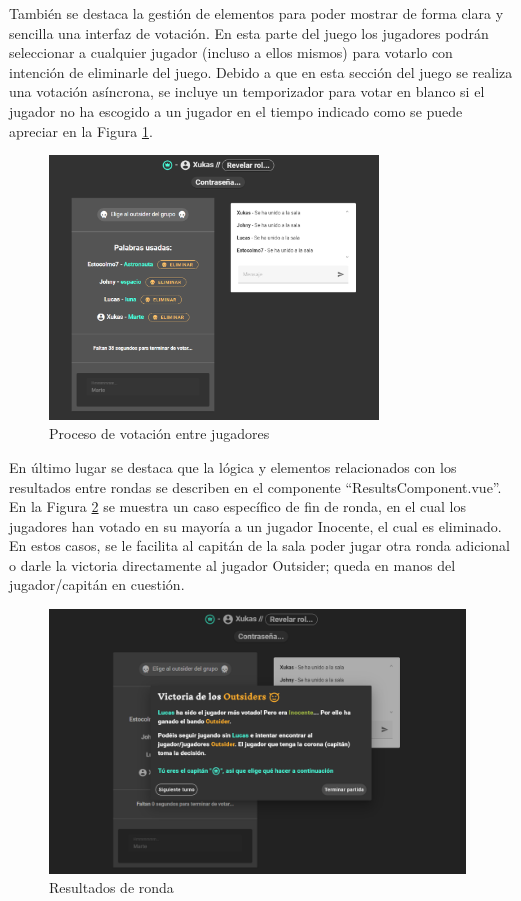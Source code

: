 También se destaca la gestión de elementos para poder mostrar de forma clara y sencilla una interfaz de votación. En esta parte
del juego los jugadores podrán seleccionar a cualquier jugador (incluso a ellos mismos) para votarlo con intención de eliminarle
del juego. Debido a que en esta sección del juego se realiza una votación asíncrona, se incluye un temporizador para votar 
en blanco si el jugador no ha escogido a un jugador en el tiempo indicado como se puede apreciar en la Figura \ref{fig:res_votacion}.

\begin{figure}[h]
	\centering
	\includegraphics[height=7cm,clip=true]{res_votacion.png}
	\caption{Proceso de votación entre jugadores}
	\label{fig:res_votacion}
\end{figure}

En último lugar se destaca que la lógica y elementos relacionados con los resultados entre rondas se describen en el 
componente ``ResultsComponent.vue''. En la Figura \ref{fig:res_resultados} se muestra un caso específico de fin de ronda, en el cual los jugadores 
han votado en su mayoría a un jugador Inocente, el cual es eliminado. En estos casos, se le facilita al capitán de 
la sala poder jugar otra ronda adicional o darle la victoria directamente al jugador Outsider; queda en manos del 
jugador/capitán en cuestión.

\begin{figure}[h]
	\centering
	\includegraphics[height=7cm,clip=true]{res_resultados.png}
	\caption{Resultados de ronda}
	\label{fig:res_resultados}
\end{figure}

